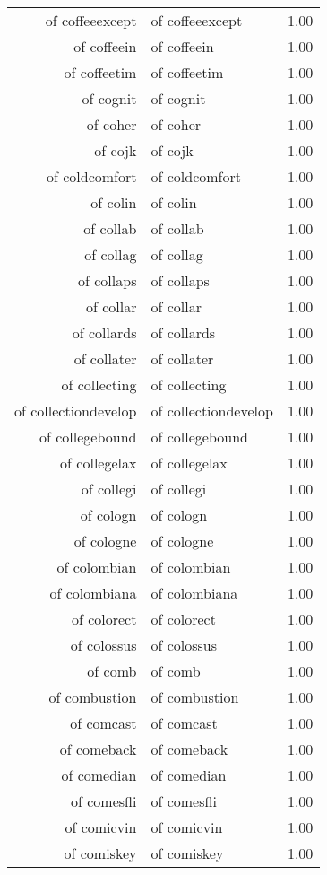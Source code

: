 \begin{table}[ht]
\begin{tabular}{rlr}
  of coffeeexcept & of coffeeexcept & 1.00 \\ 
  of coffeein & of coffeein & 1.00 \\ 
  of coffeetim & of coffeetim & 1.00 \\ 
  of cognit & of cognit & 1.00 \\ 
  of coher & of coher & 1.00 \\ 
  of cojk & of cojk & 1.00 \\ 
  of coldcomfort & of coldcomfort & 1.00 \\ 
  of colin & of colin & 1.00 \\ 
  of collab & of collab & 1.00 \\ 
  of collag & of collag & 1.00 \\ 
  of collaps & of collaps & 1.00 \\ 
  of collar & of collar & 1.00 \\ 
  of collards & of collards & 1.00 \\ 
  of collater & of collater & 1.00 \\ 
  of collecting & of collecting & 1.00 \\ 
  of collectiondevelop & of collectiondevelop & 1.00 \\ 
  of collegebound & of collegebound & 1.00 \\ 
  of collegelax & of collegelax & 1.00 \\ 
  of collegi & of collegi & 1.00 \\ 
  of cologn & of cologn & 1.00 \\ 
  of cologne & of cologne & 1.00 \\ 
  of colombian & of colombian & 1.00 \\ 
  of colombiana & of colombiana & 1.00 \\ 
  of colorect & of colorect & 1.00 \\ 
  of colossus & of colossus & 1.00 \\ 
  of comb & of comb & 1.00 \\ 
  of combustion & of combustion & 1.00 \\ 
  of comcast & of comcast & 1.00 \\ 
  of comeback & of comeback & 1.00 \\ 
  of comedian & of comedian & 1.00 \\ 
  of comesfli & of comesfli & 1.00 \\ 
  of comicvin & of comicvin & 1.00 \\ 
  of comiskey & of comiskey & 1.00 \\ 

\end{tabular}
\end{table}
